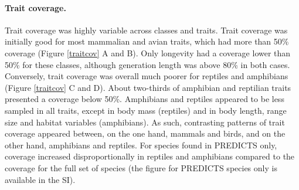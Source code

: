 \paragraph{Trait coverage.}
Trait coverage was highly variable across classes and traits. Trait coverage was initially good for most mammalian and avian traits, which had more than 50\% coverage (Figure \ref{traitcov} A and B). Only longevity had a coverage lower than 50\% for these classes, although generation length was above 80\% in both cases. Conversely, trait coverage was overall much poorer for reptiles and amphibians (Figure \ref{traitcov} C and D). About two-thirds of amphibian and reptilian traits presented a coverage below 50\%.  Amphibians and reptiles appeared to be less sampled in all traits, except in body mass (reptiles) and in body length, range size and habitat variables (amphibians).  As such, contrasting patterns of trait coverage appeared between, on the one hand, mammals and birds, and on the other hand, amphibians and reptiles. For species found in PREDICTS only, coverage increased disproportionally in reptiles and amphibians compared to the coverage for the full set of species (the figure for PREDICTS species only is available in the SI).

